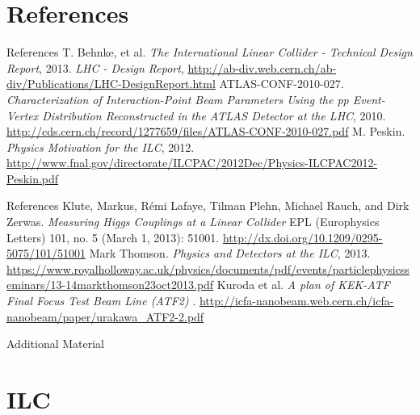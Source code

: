 \documentclass[xcolor={dvipsnames}]{beamer}
\begin{document}
\section*{References}
\begin{thebibliography}{9}
\begin{frame}{References}
 T. Behnke, et al.
\emph{The International Linear Collider - Technical Design Report}, 2013.
 \emph{LHC - Design Report}, \url{http://ab-div.web.cern.ch/ab-div/Publications/LHC-DesignReport.html}
 ATLAS-CONF-2010-027. \emph{Characterization of Interaction-Point Beam Parameters Using the pp Event-Vertex Distribution Reconstructed in the ATLAS Detector at the LHC}, 2010. \url{http://cds.cern.ch/record/1277659/files/ATLAS-CONF-2010-027.pdf}
 M. Peskin. \emph{Physics Motivation for the ILC}, 2012. \url{http://www.fnal.gov/directorate/ILCPAC/2012Dec/Physics-ILCPAC2012-Peskin.pdf}
\end{frame}
\begin{frame}{References}
 Klute, Markus, Rémi Lafaye, Tilman Plehn, Michael Rauch, and
Dirk Zerwas. \emph{Measuring Higgs Couplings at a Linear Collider}
EPL (Europhysics Letters) 101, no. 5 (March 1, 2013): 51001. \url{http://dx.doi.org/10.1209/0295-5075/101/51001}
 Mark Thomson. \emph{Physics and Detectors at the ILC}, 2013. \url{https://www.royalholloway.ac.uk/physics/documents/pdf/events/particlephysicsseminars/13-14markthomson23oct2013.pdf}
 Kuroda et al. \emph{A plan of KEK-ATF Final Focus Test Beam Line (ATF2)
}. \url{http://icfa-nanobeam.web.cern.ch/icfa-nanobeam/paper/urakawa_ATF2-2.pdf}

\end{frame}
\end{thebibliography}

\appendix

\begin{frame}
\begin{center}
\LARGE Additional Material
\end{center}
  \tableofcontents
\end{frame}

\section{ILC}
\end{document}
